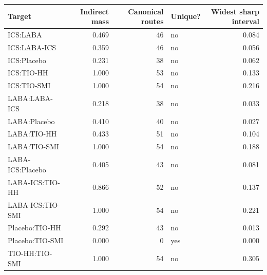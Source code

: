 \begin{tabular}{lrrlr}
\toprule
Target & Indirect mass & Canonical routes & Unique? & Widest sharp interval \\
\midrule
ICS:LABA & 0.469 & 46 & no & 0.084 \\
ICS:LABA-ICS & 0.359 & 46 & no & 0.056 \\
ICS:Placebo & 0.231 & 38 & no & 0.062 \\
ICS:TIO-HH & 1.000 & 53 & no & 0.133 \\
ICS:TIO-SMI & 1.000 & 54 & no & 0.216 \\
LABA:LABA-ICS & 0.218 & 38 & no & 0.033 \\
LABA:Placebo & 0.410 & 40 & no & 0.027 \\
LABA:TIO-HH & 0.433 & 51 & no & 0.104 \\
LABA:TIO-SMI & 1.000 & 54 & no & 0.188 \\
LABA-ICS:Placebo & 0.405 & 43 & no & 0.081 \\
LABA-ICS:TIO-HH & 0.866 & 52 & no & 0.137 \\
LABA-ICS:TIO-SMI & 1.000 & 54 & no & 0.221 \\
Placebo:TIO-HH & 0.292 & 43 & no & 0.013 \\
Placebo:TIO-SMI & 0.000 & 0 & yes & 0.000 \\
TIO-HH:TIO-SMI & 1.000 & 54 & no & 0.305 \\
\bottomrule
\end{tabular}
